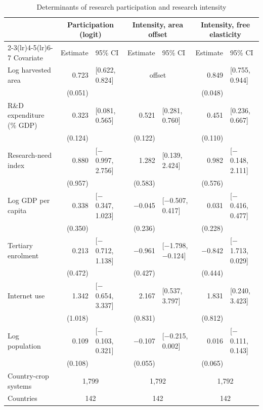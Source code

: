 \begin{table}[!t]
\centering
\footnotesize
\caption{Determinants of research participation and research intensity}
\label{tab:reg}
\begin{tabular*}{\textwidth}{@{\extracolsep\fill}l r@{\hspace{4pt}}l r@{\hspace{4pt}}l r@{\hspace{4pt}}l@{}}
\toprule
& \multicolumn{2}{c}{Participation (logit)} & \multicolumn{2}{c}{Intensity, area offset} & \multicolumn{2}{c}{Intensity, free elasticity} \\
\cmidrule(lr){2-3}\cmidrule(lr){4-5}\cmidrule(lr){6-7}
Covariate & Estimate & 95\% CI & Estimate & 95\% CI & Estimate & 95\% CI \\
\midrule
Log harvested area & 0.723 & [0.622, 0.824] & \multicolumn{2}{c}{offset} & 0.849 & [0.755, 0.944] \\
 & (0.051) & &  & & (0.048) & \\
R\&D expenditure (\% GDP) & 0.323 & [0.081, 0.565] & 0.521 & [0.281, 0.760] & 0.451 & [0.236, 0.667] \\
 & (0.124) & & (0.122) & & (0.110) & \\
Research-need index & 0.880 & [$-$0.997, 2.756] & 1.282 & [0.139, 2.424] & 0.982 & [$-$0.148, 2.111] \\
 & (0.957) & & (0.583) & & (0.576) & \\
Log GDP per capita & 0.338 & [$-$0.347, 1.023] & $-$0.045 & [$-$0.507, 0.417] & 0.031 & [$-$0.416, 0.477] \\
 & (0.350) & & (0.236) & & (0.228) & \\
Tertiary enrolment & 0.213 & [$-$0.712, 1.138] & $-$0.961 & [$-$1.798, $-$0.124] & $-$0.842 & [$-$1.713, 0.029] \\
 & (0.472) & & (0.427) & & (0.444) & \\
Internet use & 1.342 & [$-$0.654, 3.337] & 2.167 & [0.537, 3.797] & 1.831 & [0.240, 3.423] \\
 & (1.018) & & (0.831) & & (0.812) & \\
Log population & 0.109 & [$-$0.103, 0.321] & $-$0.107 & [$-$0.215, 0.002] & 0.016 & [$-$0.111, 0.143] \\
 & (0.108) & & (0.055) & & (0.065) & \\
\midrule
Country-crop systems & \multicolumn{2}{c}{1,799} & \multicolumn{2}{c}{1,792} & \multicolumn{2}{c}{1,792} \\
Countries & \multicolumn{2}{c}{142} & \multicolumn{2}{c}{142} & \multicolumn{2}{c}{142} \\

\end{tabular*}
\end{table}
